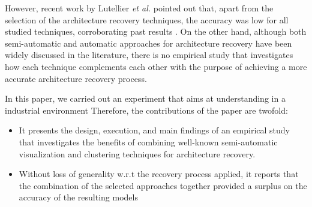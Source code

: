 However, recent work by Lutellier \textit{et al.} \cite{Lutellier_2015} pointed out that, apart from the selection of the architecture recovery techniques, the accuracy was low for all studied techniques, corroborating past results \cite{Garcia:ASE2013}. On the other hand, although both semi-automatic and automatic approaches for architecture recovery have been widely discussed in the literature, there is no empirical study that investigates  how each technique complements each other with the purpose of achieving a more accurate architecture recovery process.

In this paper, we carried out an experiment that aims at understanding in a industrial environment  Therefore, the contributions of the paper are twofold:
\begin{itemize}
\item It presents the design, execution, and main findings of an empirical study that 
investigates the benefits of combining well-known semi-automatic visualization and clustering techniques for architecture recovery. 
\item Without loss of generality w.r.t the recovery process applied, it reports that the combination of the selected approaches together provided a surplus on the accuracy of the resulting models    
\end{itemize}



